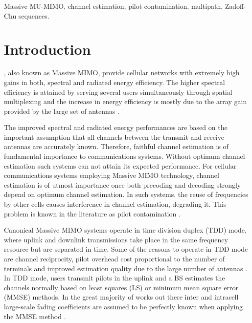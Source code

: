 \documentclass[10pt,journal,comsoc,final]{IEEEtran}
\begin{document}
\begin{IEEEkeywords}
Massive MU-MIMO, channel estimation, pilot contamination, multipath, Zadoff-Chu sequences.
\end{IEEEkeywords}

\section{Introduction}
, also known as Massive MIMO, provide cellular networks with extremely high gains in both, spectral and radiated energy efficiency. The higher spectral efficiency is attained by serving several users simultaneously through spatial multiplexing and the increase in energy efficiency is mostly due to the array gain provided by the large set of antennas \cite{marzetta:noncooperative, larsson:mmimo_next_gen}. 

The improved spectral and radiated energy performances are based on the important assumption that all channels between the transmit and receive antennas are accurately known. Therefore, faithful channel estimation is of fundamental importance to communications systems. Without optimum channel estimation such systems can not attain its expected performance. For cellular communications systems employing Massive MIMO technology, channel estimation is of utmost importance once both precoding and decoding strongly depend on optimum channel estimation. In such systems, the reuse of frequencies by other cells causes interference in channel estimation, degrading it. This problem is known in the literature as pilot contamination \cite{marzetta:noncooperative, marzetta:pilotContamination}.

Canonical Massive MIMO systems operate in time division duplex (TDD) mode, where uplink and downlink transmissions take place in the same frequency resource but are separated in time. Some of the reasons to operate in TDD mode are channel reciprocity, pilot overhead cost proportional to the number of terminals and improved estimation quality due to the large number of antennas \cite{marzetta:pilotContamination, emil:10_myths, marzetta:book}. In TDD mode, users transmit pilots in the uplink and a BS estimates the channels normally based on least squares (LS) \cite{Gesbert:coordinated} or minimum mean square error (MMSE) \cite{Debbah:howmanyantennas, Marzetta:finitedimensionalchannels} methods. In the great majority of works out there inter and intracell large-scale fading coefficients are assumed to be perfectly known when applying the MMSE method \cite{Ashikhmi:interference_reduction}.
\end{document}

